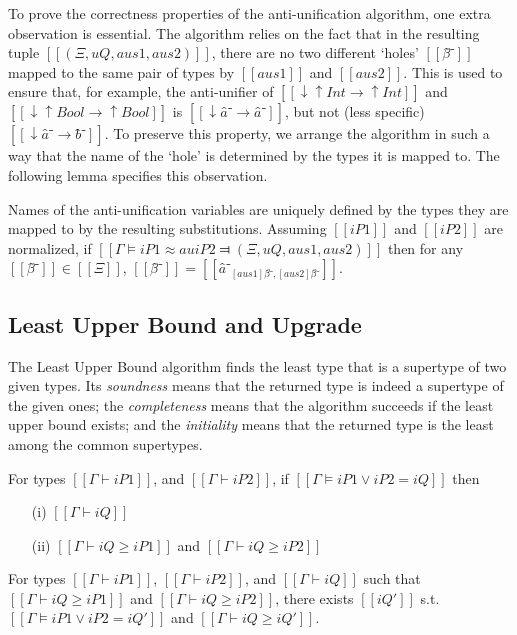 To prove the correctness properties of the anti-unification algorithm,
one extra observation is essential. The algorithm relies on the fact that
in the resulting tuple $[[(Ξ, uQ, aus1, aus2)]]$,
there are no two different `holes' $[[β̂⁻]]$
mapped to the same pair of types by $[[aus1]]$ and $[[aus2]]$.
This is used to ensure that, for example, 
the anti-unifier of $[[↓↑Int → ↑Int]]$ and 
$[[↓↑Bool → ↑Bool]]$ is $[[↓â⁻ → â⁻]]$, but not
(less specific) $[[↓â⁻ → b̂⁻]]$.
To preserve this property, we arrange the algorithm in such a way 
that the name of the `hole' is determined by the types it is mapped to.
The following lemma specifies this observation.

\begin{lemma*}
    Names of the anti-unification variables are uniquely defined by
    the types they are mapped to by the resulting substitutions. 
    Assuming $[[iP1]]$ and $[[iP2]]$ are normalized,
        if $[[Γ ⊨ iP1 ≈au iP2 ⫤ (Ξ, uQ, aus1, aus2)]]$
        then for any $[[β̂⁻]] \in [[Ξ]]$,
        $[[β̂⁻]] = [[â⁻_{[aus1]β̂⁻, [aus2]β̂⁻}]]$.
\end{lemma*}

\subsection{Least Upper Bound and Upgrade}
\label{sec:proof-lub-upgrade}

    The Least Upper Bound algorithm finds the least type that is a supertype of two given types.
    Its \emph{soundness} means that the returned type is indeed a supertype of the given ones;
    the \emph{completeness} means that the algorithm succeeds if the least upper bound exists;
    and the \emph{initiality} means that the returned type is the least among the common supertypes. 

    \begin{lemma*}
        For types $[[Γ ⊢ iP1]]$, and $[[Γ ⊢ iP2]]$,
        if $[[Γ ⊨ iP1 ∨ iP2 = iQ]]$ then
        \begin{enumerate}
            \item[(i)]  $[[Γ ⊢ iQ]]$
            \item[(ii)] $[[Γ ⊢ iQ ≥ iP1]]$ and $[[Γ ⊢ iQ ≥ iP2]]$
        \end{enumerate}
    \end{lemma*}


    \begin{lemma*}
        For types $[[Γ ⊢ iP1]]$, $[[Γ ⊢ iP2]]$, and $[[Γ ⊢ iQ]]$
        such that $[[Γ ⊢ iQ ≥ iP1]]$ and $[[Γ ⊢ iQ ≥ iP2]]$,
        there exists $[[iQ']]$ s.t. $[[Γ ⊨ iP1 ∨ iP2 = iQ']]$ 
        and $[[Γ ⊢ iQ ≥ iQ']]$.
    \end{lemma*}


